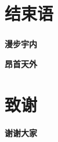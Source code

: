 \documentclass{beamer}
\begin{document}
\section{结束语}
\begin{frame}%
 \frametitle{\secname}
 \begin{center}
  \textbf{\Huge{\textcolor[rgb]{1.00,0.00,0.00}{\kai 漫步宇内}}}
 \end{center}
 \begin{center}
  \textbf{\Huge{\textcolor[rgb]{0.00,0.50,1.00}{\hei 昂首天外}}}
 \end{center}
\end{frame}
\section{致谢}
\begin{frame}[label=zhixie]
 \begin{center}
  \textbf{\Huge{\textcolor[rgb]{1.00,0.00,1.00}{\kai 谢谢大家}}}
 \end{center}
\end{frame}
\end{document}
